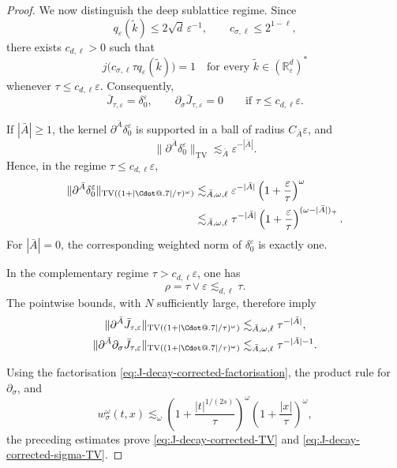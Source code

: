 \documentclass{article}
\makeatletter
\numberwithin{equation}{section}
\newcommand*\Cdot{{\mathpalette\Cdot@{.7}}}
\newcommand*\Cdot@[2]{\mathbin{\vcenter{\hbox{\scalebox{#2}{\hspace{0.1mm}$\m@th#1\bullet$\hspace{0.1mm}}}}}}
\theoremstyle{plain}
\theoremstyle{definition}
\makeatother
\begin{document}
\begin{proof}
	We now distinguish the deep sublattice regime.  Since
	\[
	q_\varepsilon(\tilde k)\leq2\sqrt d\,\varepsilon^{-1},
	\qquad
	c_{\sigma,\ell}\leq2^{1-\ell},
	\]
	there exists \(c_{d,\ell}>0\) such that
	\[
	j\bigl(c_{\sigma,\ell}\tau q_\varepsilon(\tilde k)\bigr)=1
	\quad\text{for every }\tilde k\in(\mathbb R_\varepsilon^d)^*
	\]
	whenever \(\tau\leq c_{d,\ell}\varepsilon\).  Consequently,
	\begin{equation}
		\bar J_{\tau,\varepsilon}=\delta_0^\varepsilon,
		\qquad
		\partial_\sigma\bar J_{\tau,\varepsilon}=0
		\qquad
		\text{if }\tau\leq c_{d,\ell}\varepsilon.
		\label{eq:J-decay-corrected-delta}
	\end{equation}
	
	If \(|\bar A|\geq1\), the kernel
	\(\partial^{\bar A}\delta_0^\varepsilon\) is supported in a ball of
	radius \(C_{\bar A}\varepsilon\), and
	\[
	\|\partial^{\bar A}\delta_0^\varepsilon\|_{\operatorname{TV}}
	\lesssim_{\bar A}\varepsilon^{-|\bar A|}.
	\]
	Hence, in the regime \(\tau\leq c_{d,\ell}\varepsilon\),
	\begin{align*}
		\|\partial^{\bar A}\delta_0^\varepsilon\|
		_{\operatorname{TV}((1+|\Cdot|/\tau)^\omega)}
		&\lesssim_{\bar A,\omega,\ell}
		\varepsilon^{-|\bar A|}
		\left(1+\frac{\varepsilon}{\tau}\right)^\omega
		\\
		&\lesssim_{\bar A,\omega,\ell}
		\tau^{-|\bar A|}
		\left(1+\frac{\varepsilon}{\tau}\right)^{(\omega-|\bar A|)_+}.
	\end{align*}
	For \(|\bar A|=0\), the corresponding weighted norm of
	\(\delta_0^\varepsilon\) is exactly one.
	
	In the complementary regime \(\tau>c_{d,\ell}\varepsilon\), one has
	\[
	\rho=\tau\vee\varepsilon\lesssim_{d,\ell}\tau.
	\]
	The pointwise bounds, with \(N\) sufficiently large, therefore imply
	\begin{align*}
		\|\partial^{\bar A}\bar J_{\tau,\varepsilon}\|
		_{\operatorname{TV}((1+|\Cdot|/\tau)^\omega)}
		&\lesssim_{\bar A,\omega,\ell}\tau^{-|\bar A|},
		\\
		\|\partial^{\bar A}\partial_\sigma
		\bar J_{\tau,\varepsilon}\|
		_{\operatorname{TV}((1+|\Cdot|/\tau)^\omega)}
		&\lesssim_{\bar A,\omega,\ell}\tau^{-|\bar A|-1}.
	\end{align*}
	
	Using the factorisation
	\eqref{eq:J-decay-corrected-factorisation}, the product rule for
	\(\partial_\sigma\), and
	\[
	w_\sigma^\omega(t,x)
	\lesssim_\omega
	\left(1+\frac{|t|^{1/(2s)}}{\tau}\right)^\omega
	\left(1+\frac{|x|}{\tau}\right)^\omega,
	\]
	the preceding estimates prove
	\eqref{eq:J-decay-corrected-TV} and
	\eqref{eq:J-decay-corrected-sigma-TV}.
	

\end{proof}
\end{document}
